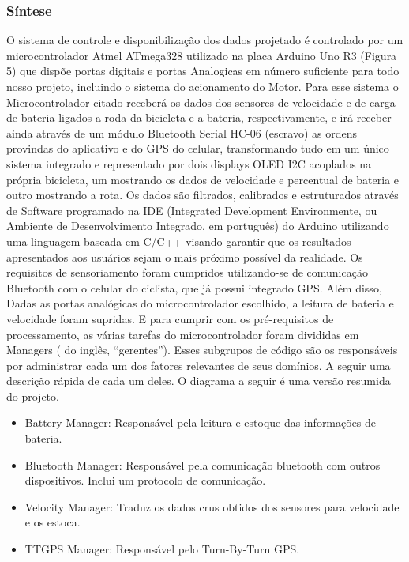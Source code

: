  		\subsubsection{Síntese}
 		O sistema de controle e disponibilização dos dados projetado é controlado por um microcontrolador Atmel ATmega328 utilizado na placa Arduino Uno R3 (Figura 5) que dispõe portas digitais e portas Analogicas em número suficiente para todo nosso projeto, incluindo o sistema do acionamento do Motor. Para esse sistema o Microcontrolador citado receberá os dados dos sensores de velocidade e de carga de bateria ligados a roda da bicicleta e a bateria, respectivamente, e irá receber ainda através de um módulo Bluetooth Serial HC-06 (escravo) as ordens provindas do aplicativo e do GPS do celular, transformando tudo em um único sistema integrado e representado por dois displays OLED I2C acoplados na própria bicicleta, um mostrando os dados de velocidade e percentual de bateria e outro mostrando a rota. Os dados são filtrados, calibrados e estruturados através de Software programado na IDE (Integrated Development Environmente, ou Ambiente de Desenvolvimento Integrado, em português) do Arduino utilizando uma linguagem baseada em C/C++ visando garantir que os resultados apresentados aos usuários sejam o mais próximo possível da realidade.
 		Os requisitos de sensoriamento foram cumpridos utilizando-se de comunicação Bluetooth com o celular do ciclista, que já possui integrado GPS. Além disso, Dadas as portas analógicas do microcontrolador escolhido, a leitura de bateria e velocidade foram supridas. E para cumprir com os pré-requisitos de processamento, as várias tarefas do microcontrolador foram divididas em Managers ( do inglês, “gerentes”). Esses subgrupos de código são os responsáveis por administrar cada um dos fatores relevantes de seus domínios. A seguir uma descrição rápida de cada um deles. O diagrama a seguir é uma versão resumida do projeto.
 		\begin{itemize}
 			\item Battery Manager: Responsável pela leitura e estoque das informações de bateria.
 			\item Bluetooth Manager: Responsável pela comunicação bluetooth com outros dispositivos. Inclui um protocolo de comunicação.
 			\item Velocity Manager: Traduz os dados crus obtidos dos sensores para velocidade e os estoca.
 			\item TTGPS Manager: Responsável pelo Turn-By-Turn GPS. 
 		\end{itemize}
